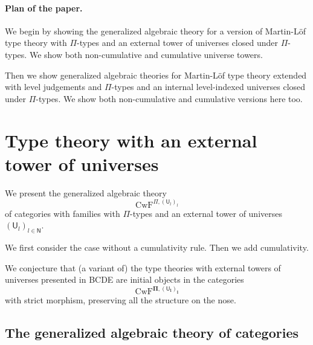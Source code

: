 \documentclass[11pt,a4paper]{article}
\theoremstyle{definition}
\newcommand{\NN}{\mathsf{N}}
\newcommand{\UU}{\mathsf{U}}
\def\NN{\mathsf{N}}
\def\UU{\mathsf{U}}
\def\CwF{\mathrm{CwF}}
\begin{document}
\paragraph{Plan of the paper.} We begin by showing the generalized algebraic theory for a version of Martin-Löf type theory with $\Pi$-types and an external tower of universes closed under $\Pi$-types. We show both non-cumulative and cumulative universe towers. 

Then we show generalized algebraic theories for Martin-Löf type theory extended with level judgements and $\Pi$-types and an internal level-indexed universes closed under $\Pi$-types. We show both non-cumulative and cumulative versions here too.

\section{Type theory with an external tower of universes}

We present the generalized algebraic theory
$$
 \CwF^{\Pi,(\UU_l)_l}
 $$
 of categories with families with $\Pi$-types and an external tower of universes $(\UU_l)_{l \in \NN}$.
  
 We first consider the case without a cumulativity rule. Then we add cumulativity.
 
 We conjecture that (a variant of) the type theories with external towers of universes presented in BCDE \cite{bcde:univ} are initial objects in the categories 
$$
 \mathbf{\CwF^{\Pi,(\UU_l)_l}}
$$
with strict morphism, preserving all the structure on the nose.
 
\subsection{The generalized algebraic theory of categories}
\end{document}
